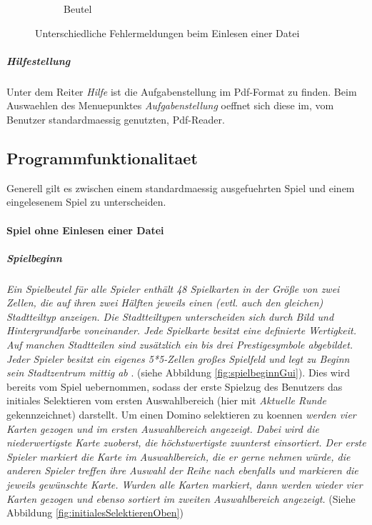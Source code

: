 \begin{figure}
\begin{subfigure}[b]{0.35\textwidth}
            \caption[]%
            {{\small Beutel}}    
            \label{fig:BeutelErr}
        \end{subfigure}
        \caption
        {\small Unterschiedliche Fehlermeldungen beim Einlesen einer Datei} 
        \label{fig:Fehleruebersicht}
    \end{figure}

\subparagraph{Hilfestellung}
Unter dem Reiter \emph{Hilfe} ist die Aufgabenstellung im Pdf-Format zu finden. Beim Auswaehlen des Menuepunktes \emph{Aufgabenstellung} oeffnet sich diese im, vom Benutzer standardmaessig genutzten, Pdf-Reader. 


\subsection{Programmfunktionalitaet}
Generell gilt es zwischen einem standardmaessig ausgefuehrten Spiel und einem eingelesenem Spiel zu unterscheiden. 

\paragraph{Spiel ohne Einlesen einer Datei}
\subparagraph{Spielbeginn}
\emph{Ein Spielbeutel für alle Spieler enthält 48 Spielkarten in der Größe von zwei Zellen, die auf ihren zwei Hälften jeweils einen (evtl. auch den gleichen) Stadtteiltyp anzeigen. Die Stadtteiltypen unterscheiden sich durch Bild und Hintergrundfarbe voneinander. Jede Spielkarte besitzt eine definierte Wertigkeit. Auf manchen Stadtteilen sind zusätzlich ein bis drei Prestigesymbole abgebildet. Jeder Spieler besitzt ein eigenes 5*5-Zellen großes Spielfeld und legt zu Beginn sein Stadtzentrum mittig ab}
\cite{aufgabenstellung}. 
(siehe Abbildung \ref{fig:spielbeginnGui}). Dies wird bereits vom Spiel uebernommen, sodass der erste Spielzug des Benutzers das initiales Selektieren vom ersten Auswahlbereich (hier mit \emph{Aktuelle Runde} gekennzeichnet) darstellt. Um einen Domino selektieren zu koennen \emph{ werden vier Karten gezogen und im ersten Auswahlbereich angezeigt. Dabei wird die niederwertigste Karte zuoberst, die höchstwertigste zuunterst einsortiert. Der erste Spieler markiert die Karte im Auswahlbereich, die er gerne nehmen würde, die anderen Spieler treffen ihre Auswahl der Reihe nach ebenfalls und markieren die jeweils gewünschte Karte. Wurden alle Karten markiert, dann werden wieder vier Karten gezogen und ebenso sortiert im zweiten Auswahlbereich angezeigt.} 
\cite{aufgabenstellung}
(Siehe Abbildung \ref{fig:initialesSelektierenOben})

